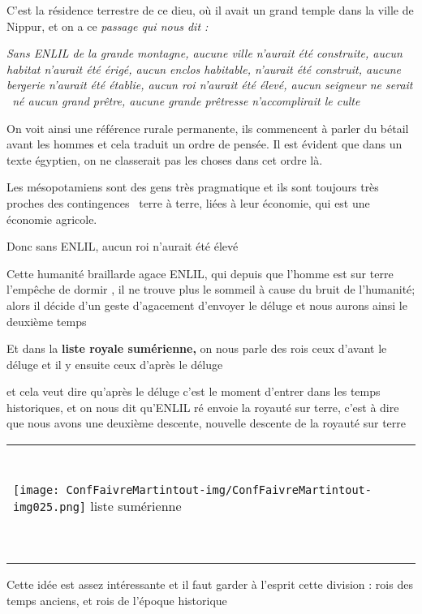 \documentclass[a4paper]{article}
\begin{document}
\bigskip

{
C'est la résidence terrestre de ce dieu, où il avait un grand temple
dans la ville de Nippur, et on a ce \textit{passage qui nous dit :}}


\bigskip

{
\textit{{\textquotedbl}Sans ENLIL de la grande montagne, aucune ville
n'aurait été construite, aucun habitat n'aurait été érigé, aucun enclos
habitable, n'aurait été construit, aucune bergerie n'aurait été
établie, aucun roi n'aurait été élevé, aucun seigneur ne serait \ né
aucun grand prêtre, aucune grande prêtresse n'accomplirait le culte}
{\textquotedbl} }


\bigskip

{
On voit ainsi une référence rurale permanente, ils commencent à parler
du bétail avant les hommes et cela traduit un ordre de pensée. Il est
évident que dans un texte égyptien, on ne classerait pas les choses
dans cet ordre là.}

{
Les mésopotamiens sont des gens très pragmatique et ils sont toujours
très proches des contingences \ terre à terre, liées à leur économie,
qui est une économie agricole.}


\bigskip

{
Donc sans ENLIL, aucun roi n'aurait été élevé}

{
Cette humanité braillarde agace ENLIL, qui depuis que l'homme est sur
terre l'empêche de dormir , il ne trouve plus le sommeil à cause du
bruit de l'humanité; alors il décide d'un geste d'agacement d'envoyer
le déluge et nous aurons ainsi le deuxième temps}


\bigskip

{
Et dans la \textbf{liste royale sumérienne,} on nous parle des rois
{\textquotedbl} ceux d'avant le déluge{\textquotedbl} et il y ensuite
ceux {\textquotedbl} d'après le déluge {\textquotedbl}}

{
et cela veut dire qu'après le déluge c'est le moment d'entrer dans les
temps historiques, et on nous dit qu'ENLIL ré envoie la royauté sur
terre, c'est à dire que nous avons une deuxième descente, nouvelle
descente de la royauté sur terre}

\begin{flushleft}
\tablefirsthead{}
\tablehead{}
\tabletail{}
\tablelasttail{}
\begin{supertabular}{m{20.119999cm}}
~
\\
{ 
\texttt{[image: ConfFaivreMartintout-img/ConfFaivreMartintout-img025.png]}
 liste sumérienne }

~
\\
\end{supertabular}
\end{flushleft}
{
Cette idée est assez intéressante et il faut garder à l'esprit cette
division : rois des temps anciens, et rois de l'époque historique}
\end{document}
